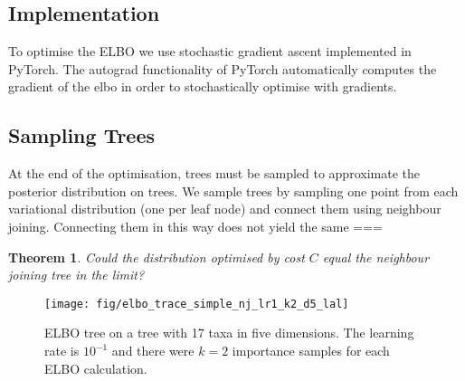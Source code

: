 \documentclass[11pt, twocolumn]{article}
\newtheorem{theorem}{Theorem}
\begin{document}
\subsection{Implementation}
To optimise the ELBO we use stochastic gradient ascent implemented in PyTorch.
The autograd functionality of PyTorch automatically computes the gradient of the elbo in order to stochastically optimise with gradients.

\subsection{Sampling Trees}
At the end of the optimisation, trees must be sampled to approximate the posterior distribution on trees.
We sample trees by sampling one point from each variational distribution (one per leaf node) and connect them using neighbour joining.
Connecting them in this way does not yield the same ===

\begin{theorem}
Could the distribution optimised by cost $C$ equal the neighbour joining tree in the limit?
\end{theorem}



\begin{figure}[htbp] \label{fig:elbo_trace}
\begin{center}
    \texttt{[image: fig/elbo\_trace\_simple\_nj\_lr1\_k2\_d5\_lal]}
\end{center}
\caption{ELBO tree on a tree with 17 taxa in five dimensions. The learning rate is $10^{-1}$ and there were $k=2$ importance samples for each ELBO calculation.}
\end{figure}
\end{document}
